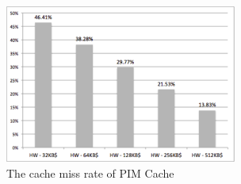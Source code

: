 \begin{figure}[h]
  \centering
  \includegraphics[width=3in]{figures/pim_cache_hit_rate.pdf}
  \caption{The cache miss rate of PIM Cache}
  \label{fig:pim_cache_hit_rate}
\end{figure}

